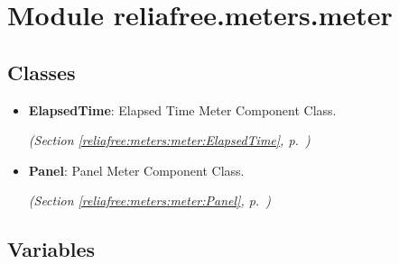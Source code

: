%
%
%


\section{Module reliafree.meters.meter}

    \label{reliafree:meters:meter}


\subsection{Classes}

\begin{itemize}  \setlength{\parskip}{0ex}
  \item \textbf{ElapsedTime}: Elapsed Time Meter Component Class.



  \textit{(Section \ref{reliafree:meters:meter:ElapsedTime}, p.~\pageref{reliafree:meters:meter:ElapsedTime})}

  \item \textbf{Panel}: Panel Meter Component Class.



  \textit{(Section \ref{reliafree:meters:meter:Panel}, p.~\pageref{reliafree:meters:meter:Panel})}

\end{itemize}


  \subsection{Variables}

